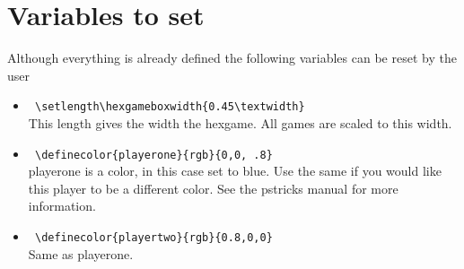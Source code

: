 \documentclass{article}
\begin{document}
\section{Variables to set}
Although everything is already defined the following variables can be reset by the user

\begin{itemize}
	\item \verb+ \setlength\hexgameboxwidth{0.45\textwidth}+ \\
		This length gives the width the hexgame. All games are scaled to this width.
	\item \verb+ \definecolor{playerone}{rgb}{0,0, .8}+	\\	
		playerone is a color, in this case set to blue. Use the same if you would like
		this player to be a different color. See the pstricks manual for more information.
	\item \verb+ \definecolor{playertwo}{rgb}{0.8,0,0}+	\\
		Same as playerone.
\end{itemize}

\begin{center}
\begin{hexgame}{3}
\end{hexgame}
\begin{hexgame}{16}
\end{hexgame}
\end{center}
\end{document}
